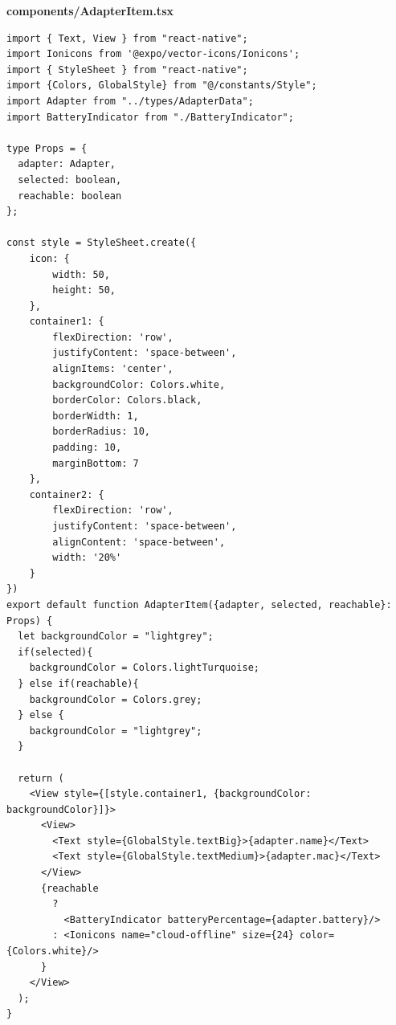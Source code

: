 \documentclass[11pt, twoside]{article}
\begin{document}
\textbf{components/AdapterItem.tsx}
\begin{lstlisting}
import { Text, View } from "react-native";
import Ionicons from '@expo/vector-icons/Ionicons';
import { StyleSheet } from "react-native";
import {Colors, GlobalStyle} from "@/constants/Style";
import Adapter from "../types/AdapterData";
import BatteryIndicator from "./BatteryIndicator";

type Props = {
  adapter: Adapter,
  selected: boolean,
  reachable: boolean
};

const style = StyleSheet.create({
    icon: {
        width: 50,
        height: 50,
    },
    container1: {
        flexDirection: 'row',
        justifyContent: 'space-between',
        alignItems: 'center',
        backgroundColor: Colors.white,
        borderColor: Colors.black,
        borderWidth: 1,
        borderRadius: 10,
        padding: 10,
        marginBottom: 7
    },
    container2: {
        flexDirection: 'row',
        justifyContent: 'space-between',
        alignContent: 'space-between',
        width: '20%'
    }
})
export default function AdapterItem({adapter, selected, reachable}: Props) {
  let backgroundColor = "lightgrey";
  if(selected){
    backgroundColor = Colors.lightTurquoise;
  } else if(reachable){
    backgroundColor = Colors.grey;
  } else {
    backgroundColor = "lightgrey";
  }
  
  return (
    <View style={[style.container1, {backgroundColor: backgroundColor}]}>
      <View>
        <Text style={GlobalStyle.textBig}>{adapter.name}</Text>
        <Text style={GlobalStyle.textMedium}>{adapter.mac}</Text>
      </View>
      {reachable 
        ? 
          <BatteryIndicator batteryPercentage={adapter.battery}/>
        : <Ionicons name="cloud-offline" size={24} color={Colors.white}/>
      }
    </View>
  );
}
\end{lstlisting}
\end{document}
